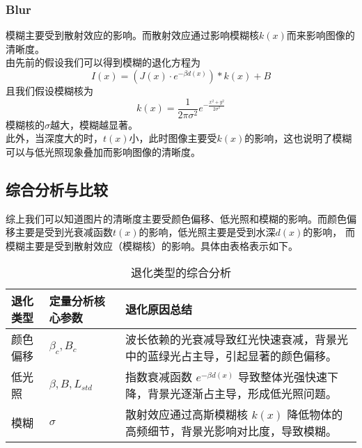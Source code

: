 \documentclass[11pt]{ctexart}
\begin{document}
    \subsubsection{Blur}
    模糊主要受到散射效应的影响。而散射效应通过影响模糊核$k(x)$而来影响图像的清晰度。\\
    由先前的假设我们可以得到模糊的退化方程为\[I(x) = (J(x) \cdot e^{-\beta d(x)})*k(x) + B\]
    且我们假设模糊核为\[k(x) = \frac{1}{2\pi\sigma^2} e^{-\frac{x^2 + y^2}{2\sigma^2}}\]
    模糊核的$\sigma$越大，模糊越显著。\\
    此外，当深度大的时，$t(x)$小，此时图像主要受$k(x)$的影响，这也说明了模糊可以与低光照现象叠加而影响图像的清晰度。
    \subsection{综合分析与比较}
    综上我们可以知道图片的清晰度主要受颜色偏移、低光照和模糊的影响。而颜色偏移主要是受到光衰减函数$t(x)$的影响，低光照主要是受到水深$d(x)$的影响，
    而模糊主要是受到散射效应（模糊核）的影响。具体由表格表示如下。

\begin{table}[ht]
\centering
\begin{tabularx}{\textwidth}{|X|X|X|}
\hline
\textbf{退化类型} & \textbf{定量分析核心参数} & \textbf{退化原因总结} \\ \hline
颜色偏移     & $\beta_c, B_c$ & 波长依赖的光衰减导致红光快速衰减，背景光中的蓝绿光占主导，引起显著的颜色偏移。 \\ \hline
低光照       & $\beta, B, L_{std}$      & 指数衰减函数 $e^{-\beta d(x)}$ 导致整体光强快速下降，背景光逐渐占主导，形成低光照问题。 \\ \hline
模糊         & $\sigma$               & 散射效应通过高斯模糊核 $k(x)$ 降低物体的高频细节，背景光影响对比度，导致模糊。 \\ \hline
\end{tabularx}
\caption{退化类型的综合分析}
\end{table}
\end{document}
